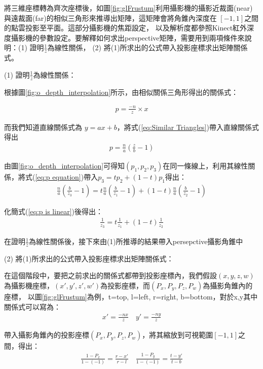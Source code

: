 	                    
	將三維座標轉為齊次座標後，如圖\ref{fig:glFrustum}利用攝影機的攝影近裁面(near)與遠裁面(far)的相似三角形來推導出矩陣，這矩陣會將角錐內深度在
	$[-1,1]$之間的點雲投影至平面。這部分攝影機的焦距設定，
	以及解析度都參照Kinect紅外深度攝影機的參數設定。要解釋如何求出perspective矩陣，需要用到兩項條件來說明：(1) 證明$\frac{1}{z}$為線性關係，
	(2) 將(1)所求出的公式帶入投影座標求出矩陣關係式。
	
	(1) 證明$\frac{1}{z}$為線性關係：
	
	根據圖\ref{fig:o_depth_interpolation}所示，由相似關係三角形得出的關係式：
	
	\begin{align}
		\label{eq:Similar Triangles}
		p = \frac{-n}{z} \times x		 		
	\end{align}
	
	而我們知道直線關係式為 $y = ax + b$，將式(\ref{eq:Similar Triangles})帶入直線關係式得出	
	\begin{align}
		\label{eq:p equation}
		p = \frac{n}{a} (\frac{z}{b} - 1)
	\end{align}
	
	由圖\ref{fig:o_depth_interpolation}可得知$(p_1,p_2,p_3)$在同一條線上，利用其線性關係，將式(\ref{eq:p equation})帶入$p_3 = tp_2 +(1-t)p_1$得出：	
	\begin{align}
		\label{eq:p is linear}
		\frac{n}{a} (\frac{b}{z_3} - 1) = t \frac{n}{a} ( \frac{b}{z_1} - 1) + (1-t)\frac{n}{a} (\frac{b}{z_2} - 1)
	\end{align}
	
	化簡式(\ref{eq:p is linear})後得出：
	\begin{align}
		\frac{1}{z_3} = t \frac{1}{z_1}  + (1-t)\frac{1}{z_2} 
	\end{align}
		
	在證明$\frac{1}{z}$為線性關係後，接下來由(1)所推導的結果帶入persepctive攝影角錐中
		
	(2) 將(1)所求出的公式帶入投影座標求出矩陣關係式：
	
	在這個階段中，要把之前求出的關係式都帶到投影座標內，我們假設$(x, y, z, w)$為攝影機座標，$(x', y', z', w')$為投影座標，而$(P_x,P_y,P_z,P_w)$為攝影角錐內的座標，
	以圖\ref{fig:glFrustum}為例，t=top, l=left, r=right, b=bottom，對於x,y其中關係式可以寫為：	
	\begin{align}
	\label{eq:x,y is linear}
		x' = \frac{-nx}{z}  \quad y' = \frac{-ny}{z}
	\end{align}
	
	帶入攝影角錐內的投影座標$(P_x,P_y,P_z,P_w)$，將其縮放到可視範圍$[-1,1]$之間，得出：	
	\begin{align}
	\label{eq:P in perspective}
		\frac{1-P_x}{1-(-1)} = \frac{r-x'}{r-l} \quad 	\frac{1-P_y}{1-(-1)} = \frac{t-y'}{t-b}
	\end{align}
	
